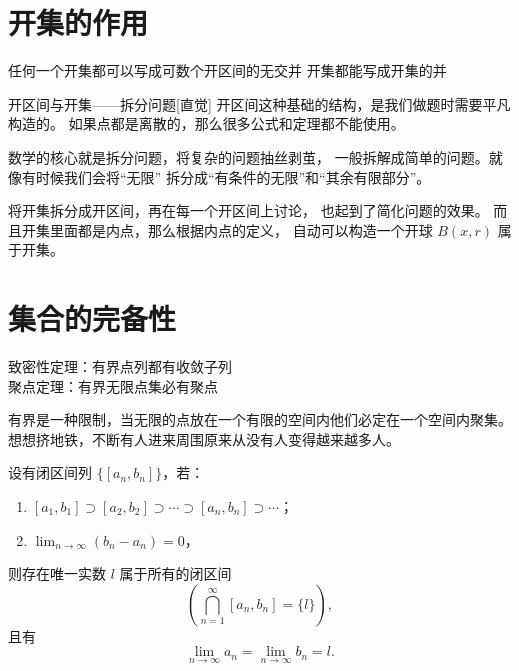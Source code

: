 \documentclass[lang=cn,10pt]{elegantbook}
\begin{document}
\section{开集的作用}

\begin{proposition}
    任何一个开集都可以写成可数个开区间的无交并
    开集都能写成开集的并
\end{proposition}
\begin{dxtips}{开区间与开集——拆分问题}[直觉]
开区间这种基础的结构，是我们做题时需要平凡构造的。  
如果点都是离散的，那么很多公式和定理都不能使用。  

数学的核心就是拆分问题，将复杂的问题抽丝剥茧，  
一般拆解成简单的问题。就像有时候我们会将“无限”  
拆分成“有条件的无限”和“其余有限部分”。  

将开集拆分成开区间，再在每一个开区间上讨论，  
也起到了简化问题的效果。  
而且开集里面都是内点，那么根据内点的定义，  
自动可以构造一个开球 $B(x,r)$ 属于开集。
\end{dxtips}


\section{集合的完备性}
\begin{theorem}
    致密性定理：有界点列都有收敛子列\\
    聚点定理：有界无限点集必有聚点
\end{theorem}
有界是一种限制，当无限的点放在一个有限的空间内他们必定在一个空间内聚集。想想挤地铁，不断有人进来周围原来从没有人变得越来越多人。
\begin{theorem}[闭区间套定理]{}
设有闭区间列 $\{[a_n, b_n]\}$，若：

\begin{enumerate}
  \item $[a_1, b_1] \supset [a_2, b_2] \supset \cdots \supset [a_n, b_n] \supset \cdots$；
  \item $\displaystyle \lim_{n \to \infty} (b_n - a_n) = 0$，
\end{enumerate}

则存在唯一实数 $l$ 属于所有的闭区间
\[
\left( \bigcap_{n=1}^\infty [a_n, b_n] = \{l\} \right),
\]
且有
\[
\lim_{n \to \infty} a_n = \lim_{n \to \infty} b_n = l.
\]
\end{theorem}
\end{document}
